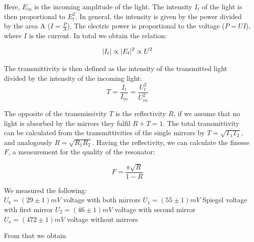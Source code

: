 \documentclass{article}
\DeclarePairedDelimiter\abs{\lvert}{\rvert}%
\begin{document}
Here, $E_{in}$ is the incoming amplitude of the light. The intensity $I_{t}$ of the light is then proportional to $E_{t}^{2}$. In general, the intensity is given by the power divided by the area A ($I=\frac{P}{A}$). The electric power is proportional to the voltage ($P=UI$), where $I$ is the current. In total we obtain the relation:

\begin{equation}
\abs{I_{t}} \propto \abs{E_{t}}^{2} \propto U^{2}
\end{equation}

The transmittivity is then defined as the intensity of the transmitted light divided by the intensity of the incoming light:
\begin{equation}
T = \frac{I_{t}}{I_{in}} = \frac{U_{t}^{2}}{U_{in}^{2}}
\label{transmittivitybyvoltage}
\end{equation}

The opposite of the transmissivity $T$ is the reflectivity $R$, if we assume that no light is absorbed by the mirrors they fulfil $R+T=1$. The total transmittivity can be calculated from the transmittivities of the single mirrors by $T = \sqrt{T_{1}T_{2}}$, and analogously  $R = \sqrt{R_{1}R_{2}}$. Having the reflectivity, we can calculate the finesse $F$, a measurement for the quality of the resonator:

\begin{equation}
F= \frac{\pi\sqrt{R}}{1-R}
\end{equation}

We measured the following:\\
$U_b = (29\pm1)mV$ voltage with both mirrors
$U_1 = (55\pm1)mV$  Spiegel voltage with first mirror
$U_2 = (46\pm1)mV$  voltage with second mirror
$U_o = (472\pm1)mV$ voltage without mirrors

From that we obtain 
\end{document}
